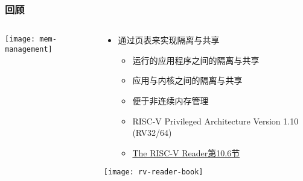 \begin{frame}   
	\frametitle{回顾}
	
	\begin{columns}
		
		\begin{column}{.5\textwidth}
			
			\texttt{[image: mem-management]}
			
		\end{column}
		
		
		\begin{column}{.5\textwidth}
			
			\begin{itemize}\large
				\item 通过页表来实现隔离与共享
				\begin{itemize}
					\item 运行的应用程序之间的隔离与共享
					\item 应用与内核之间的隔离与共享
					\item 便于非连续内存管理						
					\item RISC-V Privileged Architecture Version 1.10 (RV32/64)
					\item \href{http://crva.ict.ac.cn/documents/RISC-V-Reader-Chinese-v2p1.pdf}{The RISC-V Reader第10.6节}	
				\end{itemize}
			\end{itemize}
			\centering
			\texttt{[image: rv-reader-book]}
		\end{column}
		
		
	\end{columns}
	
\end{frame}

